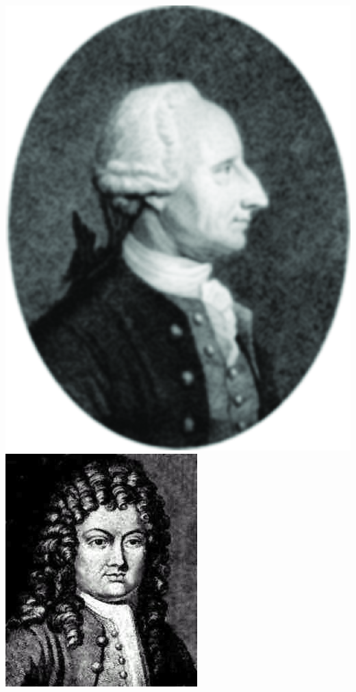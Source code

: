 \documentclass[fleqn]{beamer} %
\begin{document}
\begin{frame}[label=sectionIIsubsectionI]
				\hspace{10mm}\includegraphics[scale=.40]{images/Joseph-Raphson-1648-1715.png}
				\hspace{10mm}\includegraphics[scale=.30]{images/BTaylor.jpg}
				\btVFill
			\end{frame}	
\end{document}
